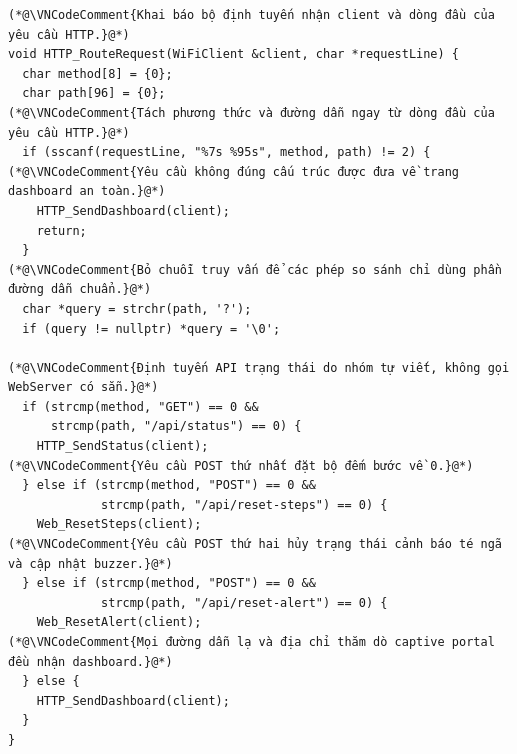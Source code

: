\documentclass[12pt]{article}
\begin{document}
\Needspace{0.26\textheight}
\begin{lstlisting}[style=firmware,caption={Tự phân tích và định tuyến yêu cầu HTTP}]
(*@\VNCodeComment{Khai báo bộ định tuyến nhận client và dòng đầu của yêu cầu HTTP.}@*)
void HTTP_RouteRequest(WiFiClient &client, char *requestLine) {
  char method[8] = {0};
  char path[96] = {0};
(*@\VNCodeComment{Tách phương thức và đường dẫn ngay từ dòng đầu của yêu cầu HTTP.}@*)
  if (sscanf(requestLine, "%7s %95s", method, path) != 2) {
(*@\VNCodeComment{Yêu cầu không đúng cấu trúc được đưa về trang dashboard an toàn.}@*)
    HTTP_SendDashboard(client);
    return;
  }
(*@\VNCodeComment{Bỏ chuỗi truy vấn để các phép so sánh chỉ dùng phần đường dẫn chuẩn.}@*)
  char *query = strchr(path, '?');
  if (query != nullptr) *query = '\0';

(*@\VNCodeComment{Định tuyến API trạng thái do nhóm tự viết, không gọi WebServer có sẵn.}@*)
  if (strcmp(method, "GET") == 0 &&
      strcmp(path, "/api/status") == 0) {
    HTTP_SendStatus(client);
(*@\VNCodeComment{Yêu cầu POST thứ nhất đặt bộ đếm bước về 0.}@*)
  } else if (strcmp(method, "POST") == 0 &&
             strcmp(path, "/api/reset-steps") == 0) {
    Web_ResetSteps(client);
(*@\VNCodeComment{Yêu cầu POST thứ hai hủy trạng thái cảnh báo té ngã và cập nhật buzzer.}@*)
  } else if (strcmp(method, "POST") == 0 &&
             strcmp(path, "/api/reset-alert") == 0) {
    Web_ResetAlert(client);
(*@\VNCodeComment{Mọi đường dẫn lạ và địa chỉ thăm dò captive portal đều nhận dashboard.}@*)
  } else {
    HTTP_SendDashboard(client);
  }
}
\end{lstlisting}
\end{document}
